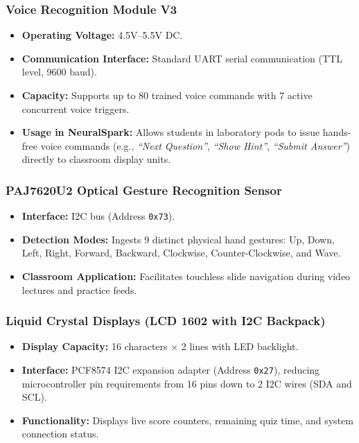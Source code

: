\subsubsection{Voice Recognition Module V3}
\begin{itemize}[leftmargin=*]
    \item \textbf{Operating Voltage:} 4.5V--5.5V DC.
    \item \textbf{Communication Interface:} Standard UART serial communication (TTL level, 9600 baud).
    \item \textbf{Capacity:} Supports up to 80 trained voice commands with 7 active concurrent voice triggers.
    \item \textbf{Usage in NeuralSpark:} Allows students in laboratory pods to issue hands-free voice commands (e.g., \textit{``Next Question''}, \textit{``Show Hint''}, \textit{``Submit Answer''}) directly to classroom display units.
\end{itemize}

\subsubsection{PAJ7620U2 Optical Gesture Recognition Sensor}
\begin{itemize}[leftmargin=*]
    \item \textbf{Interface:} I2C bus (Address \texttt{0x73}).
    \item \textbf{Detection Modes:} Ingests 9 distinct physical hand gestures: Up, Down, Left, Right, Forward, Backward, Clockwise, Counter-Clockwise, and Wave.
    \item \textbf{Classroom Application:} Facilitates touchless slide navigation during video lectures and practice feeds.
\end{itemize}

\subsubsection{Liquid Crystal Displays (LCD 1602 with I2C Backpack)}
\begin{itemize}[leftmargin=*]
    \item \textbf{Display Capacity:} 16 characters $\times$ 2 lines with LED backlight.
    \item \textbf{Interface:} PCF8574 I2C expansion adapter (Address \texttt{0x27}), reducing microcontroller pin requirements from 16 pins down to 2 I2C wires (SDA and SCL).
    \item \textbf{Functionality:} Displays live score counters, remaining quiz time, and system connection status.
\end{itemize}

